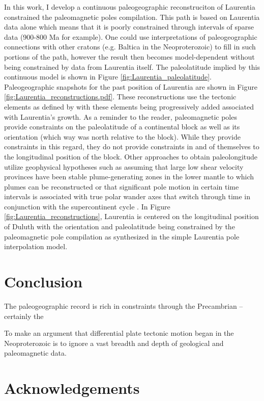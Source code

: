 \documentclass[11pt,letterpaper]{article}
\begin{document}
{In this work, I develop a continuous paleogeographic reconstruciton of Laurentia constrained the paleomagnetic poles compilation. This path is based on Laurentia data alone which means that it is poorly constrained through intervals of sparse data (900-800 Ma for example). One could use interpretations of paleogeographic connections with other cratons (e.g. Baltica in the Neoproterozoic) to fill in such portions of the path, however the result then becomes model-dependent without being constrained by data from Laurentia itself. The paleolatitude implied by this continuous model is shown in Figure \ref{fig:Laurentia_paleolatitude}. Paleogeographic snapshots for the past position of Laurentia are shown in Figure \ref{fig:Laurentia_reconstructions.pdf}. These reconstructions use the tectonic elements as defined by \citet{Whitmeyer2007a} with these elements being progressively added associated with Laurentia's growth. As a reminder to the reader, paleomagnetic poles provide constraints on the paleolatitude of a continental block as well as its orientation (which way was north relative to the block). While they provide constraints in this regard, they do not provide constraints in and of themselves to the longitudinal position of the block. Other approaches to obtain paleolongitude utilize geophysical hypotheses such as assuming that large low shear velocity provinces have been stable plume-generating zones in the lower mantle to which plumes can be reconstructed \citep{Torsvik2014a} or that significant pole motion in certain time intervals is associated with true polar wander axes that switch through time in conjunction with the supercontinent cycle \citep{Mitchell2012a}. In Figure \ref{fig:Laurentia_reconstructions}, Laurentia is centered on the longitudinal position of Duluth with the orientation and paleolatitude being constrained by the paleomagnetic pole compilation as synthesized in the simple Laurentia pole interpolation model.

\section*{Conclusion}

The paleogeographic record is rich in constraints through the Precambrian -- certainly the 

To make an argument that differential plate tectonic motion began in the Neoproterozoic is to ignore a vast breadth and depth of geological and paleomagnetic data.

\section*{Acknowledgements}

}
\end{document}
